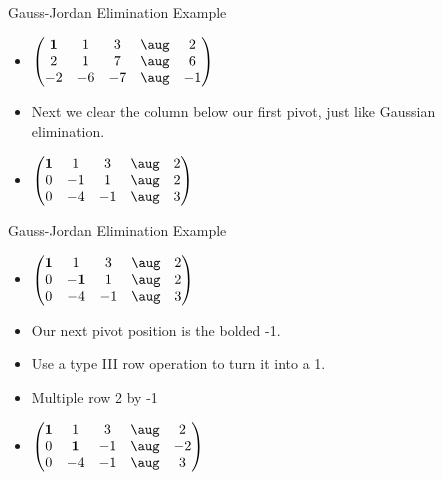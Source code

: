 \documentclass{beamer}
\begin{document}

\begin{frame}{Gauss-Jordan Elimination Example}

\begin{itemize}
\item $
\begin{pmatrix}
\bf{1} &   1   &   3    &  \aug &    2 \\
        2  &   1   &   7    &  \aug &    6  \\
       -2  &  -6   &  -7    &  \aug &   -1  \\
\end{pmatrix}
$
\item Next we clear the column below our first pivot, just like Gaussian elimination.
\item $
\begin{pmatrix}
\bf{1} &    1   &   3    &  \aug &    2 \\
        0  &   -1   &   1    &  \aug &    2  \\
        0  &   -4   &  -1    &  \aug &    3  \\
\end{pmatrix}
$
\end{itemize}
\end{frame}


\begin{frame}{Gauss-Jordan Elimination Example}

\begin{itemize}
\item $
\begin{pmatrix}
\bf{1} &            1    &   3    &  \aug &    2 \\
        0  &   \bf{-1 }  &   1    &  \aug &    2  \\
        0  &            -4   &  -1    &  \aug &    3  \\
\end{pmatrix}
$
\item Our next pivot position is the bolded -1.
\item Use a type III row operation to turn it into a 1.
\item Multiple row 2 by -1
\item $
\begin{pmatrix}
\bf{1} &            1    &    3    &  \aug &    2 \\
        0  &   \bf{ 1 }  &   -1    &  \aug &   -2  \\
        0  &            -4   &   -1    &  \aug &    3  \\
\end{pmatrix}
$
\end{itemize}
\end{frame}
\end{document}
